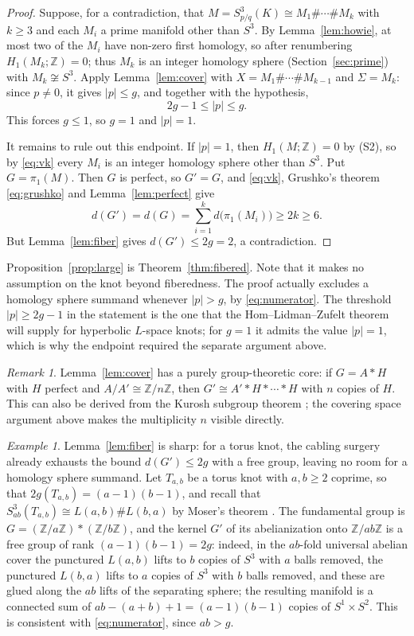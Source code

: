 \documentclass[11pt]{article}
\newcommand{\Z}{\mathbb Z}
\newcommand{\Surg}[2]{S^3_{#1}(#2)}
\newcommand{\rk}{d}
\theoremstyle{definition}
\theoremstyle{remark}
\newtheorem{remark}[theorem]{Remark}
\newtheorem{example}[theorem]{Example}
\begin{document}
\begin{proof}
Suppose, for a contradiction, that \(M=\Surg{p/q}{K}\cong M_1\#\cdots\#M_k\)
with \(k\geq3\) and each \(M_i\) a prime manifold other than \(S^3\). By
Lemma~\ref{lem:howie}, at most two of the \(M_i\) have non-zero first
homology, so after renumbering \(H_1(M_k;\Z)=0\); thus \(M_k\) is an
integer homology sphere (Section~\ref{sec:prime}) with
\(M_k\not\cong S^3\). Apply Lemma~\ref{lem:cover} with
\(X=M_1\#\cdots\#M_{k-1}\) and \(\Sigma=M_k\): since \(p\neq0\), it gives
\(|p|\leq g\), and together with the hypothesis,
\[
 2g-1\leq|p|\leq g .
\]
This forces \(g\leq1\), so \(g=1\) and \(|p|=1\).

It remains to rule out this endpoint. If \(|p|=1\), then
\(H_1(M;\Z)=0\) by (S2), so by \eqref{eq:vk} every \(M_i\) is an integer
homology sphere other than \(S^3\). Put \(G=\pi_1(M)\). Then \(G\) is
perfect, so \(G'=G\), and \eqref{eq:vk}, Grushko's theorem
\eqref{eq:grushko} and Lemma~\ref{lem:perfect} give
\[
 \rk(G')=\rk(G)=\sum_{i=1}^k\rk\bigl(\pi_1(M_i)\bigr)\geq2k\geq6.
\]
But Lemma~\ref{lem:fiber} gives \(\rk(G')\leq2g=2\), a contradiction.
\end{proof}

Proposition~\ref{prop:large} is Theorem~\ref{thm:fibered}. Note that it
makes no assumption on the knot beyond fiberedness. The proof actually
excludes a homology sphere summand whenever \(|p|>g\), by
\eqref{eq:numerator}. The threshold \(|p|\geq 2g-1\) in the statement is
the one that the Hom--Lidman--Zufelt theorem will supply for hyperbolic
\(L\)-space knots; for \(g=1\) it admits the value \(|p|=1\), which is
why the endpoint required the separate argument above.

\begin{remark}\label{rem:algebraic}
Lemma~\ref{lem:cover} has a purely group-theoretic core: if \(G=A*H\)
with \(H\) perfect and \(A/A'\cong\Z/n\Z\), then
\(G'\cong A'*H*\cdots*H\) with \(n\) copies of \(H\). This can also be
derived from the Kurosh subgroup theorem \cite{Kurosh1934}; the covering
space argument above makes the multiplicity \(n\) visible directly.
\end{remark}

\begin{example}\label{ex:torus}
Lemma~\ref{lem:fiber} is sharp: for a torus knot, the cabling surgery
already exhausts the bound \(\rk(G')\leq2g\) with a free group, leaving
no room for a homology sphere summand. Let \(T_{a,b}\) be a torus knot
with \(a,b\geq2\) coprime, so that \(2g(T_{a,b})=(a-1)(b-1)\), and recall
that \(\Surg{ab}{T_{a,b}}\cong L(a,b)\#L(b,a)\) by Moser's theorem
\cite{Moser1971}. The fundamental group is \(G=(\Z/a\Z)*(\Z/b\Z)\), and
the kernel \(G'\) of its abelianization onto \(\Z/ab\Z\) is a free group
of rank \((a-1)(b-1)=2g\): indeed, in the \(ab\)-fold universal abelian
cover the punctured \(L(a,b)\) lifts to \(b\) copies of \(S^3\) with
\(a\) balls removed, the punctured \(L(b,a)\) lifts to \(a\) copies of
\(S^3\) with \(b\) balls removed, and these are glued along the \(ab\)
lifts of the separating sphere; the resulting manifold is a connected
sum of \(ab-(a+b)+1=(a-1)(b-1)\) copies of \(S^1\times S^2\). This is
consistent with \eqref{eq:numerator}, since \(ab>g\).
\end{example}
\end{document}
